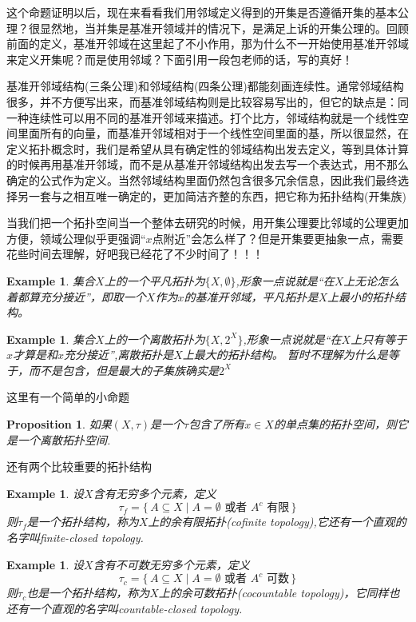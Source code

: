 \documentclass{article}
\newtheorem{proposition}[theorem]{Proposition}
\newtheorem{example}[theorem]{Example}
\newcommand\Set[2]{\{\,#1\mid#2\,\}} %
\begin{document}
这个命题证明以后，现在来看看我们用邻域定义得到的开集是否遵循开集的基本公理？很显然地，当并集是基准开领域并的情况下，是满足上诉的开集公理的。回顾前面的定义，基准开邻域在这里起了不小作用，那为什么不一开始使用基准开邻域来定义开集呢？而是使用邻域？下面引用一段包老师的话，写的真好！

基准开邻域结构(三条公理)和邻域结构(四条公理)都能刻画连续性。通常邻域结构很多，并不方便写出来，而基准邻域结构则是比较容易写出的，但它的缺点是：同一种连续性可以用不同的基准开邻域来描述。打个比方，邻域结构就是一个线性空间里面所有的向量，而基准开邻域相对于一个线性空间里面的基，所以很显然，在定义拓扑概念时，我们是希望从具有确定性的邻域结构出发去定义，等到具体计算的时候再用基准开邻域，而不是从基准开邻域结构出发去写一个表达式，用不那么确定的公式作为定义。当然邻域结构里面仍然包含很多冗余信息，因此我们最终选择另一套与之相互唯一确定的，更加简洁齐整的东西，把它称为拓扑结构(开集族)

当我们把一个拓扑空间当一个整体去研究的时候，用开集公理要比邻域的公理更加方便，领域公理似乎更强调“$x$点附近”会怎么样了？但是开集要更抽象一点，需要花些时间去理解，好吧我已经花了不少时间了！！！

\begin{example}
集合$X$上的一个平凡拓扑为$\{X,\emptyset\}$,形象一点说就是“在$X$上无论怎么着都算充分接近”，即取一个$X$作为$x$的基准开邻域，平凡拓扑是$X$上最小的拓扑结构。
\end{example}

\begin{example}
集合$X$上的一个离散拓扑为$\{X,2^{X}\}$,形象一点说就是“在$X$上只有等于$x$才算是和$x$充分接近”,离散拓扑是$X$上最大的拓扑结构。 暂时不理解为什么是等于，而不是包含，但是最大的子集族确实是$2^{X}$
\end{example}

这里有一个简单的小命题
\begin{proposition}
如果$(X,\tau)$是一个$\tau$包含了所有$x \in X$的单点集的拓扑空间，则它是一个离散拓扑空间.
\end{proposition}

还有两个比较重要的拓扑结构

\begin{example}
设$X$含有无穷多个元素，定义\[\tau_f = \Set{A \subseteq X}{A = \emptyset \text{ 或者 } A^c \text{ 有限}}\]则$\tau_f$是一个拓扑结构，称为$X$上的余有限拓扑(cofinite topology),它还有一个直观的名字叫finite-closed topology.
\end{example}

\begin{example}
设$X$含有不可数无穷多个元素，定义\[\tau_c = \Set{A \subseteq X}{A = \emptyset \text{ 或者 } A^c \text{ 可数}}\]则$\tau_c$也是一个拓扑结构，称为$X$上的余可数拓扑(cocountable topology)，它同样也还有一个直观的名字叫countable-closed topology.
\end{example}
\end{document}

